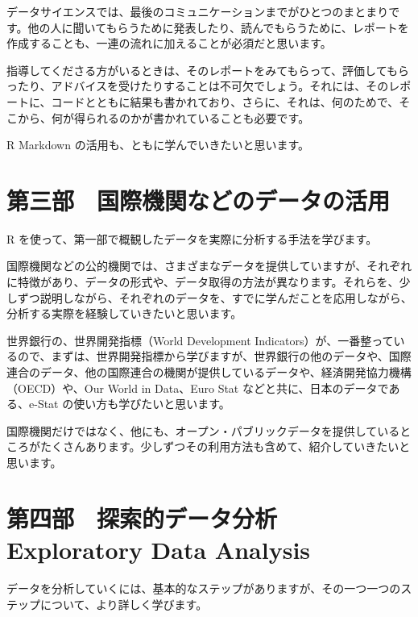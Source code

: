 \documentclass[
  xelatex, ja=standard]{bxjsbook}
\theoremstyle{definition}
\theoremstyle{definition}
\theoremstyle{definition}
\theoremstyle{definition}
\theoremstyle{remark}
\begin{document}
データサイエンスでは、最後のコミュニケーションまでがひとつのまとまりです。他の人に聞いてもらうために発表したり、読んでもらうために、レポートを作成することも、一連の流れに加えることが必須だと思います。

指導してくださる方がいるときは、そのレポートをみてもらって、評価してもらったり、アドバイスを受けたりすることは不可欠でしょう。それには、そのレポートに、コードとともに結果も書かれており、さらに、それは、何のためで、そこから、何が得られるのかが書かれていることも必要です。

R Markdown の活用も、ともに学んでいきたいと思います。

\hypertarget{ux7b2cux4e09ux90e8-ux56fdux969bux6a5fux95a2ux306aux3069ux306eux30c7ux30fcux30bfux306eux6d3bux7528}{%
\section{第三部　国際機関などのデータの活用}\label{ux7b2cux4e09ux90e8-ux56fdux969bux6a5fux95a2ux306aux3069ux306eux30c7ux30fcux30bfux306eux6d3bux7528}}

R を使って、第一部で概観したデータを実際に分析する手法を学びます。

国際機関などの公的機関では、さまざまなデータを提供していますが、それぞれに特徴があり、データの形式や、データ取得の方法が異なります。それらを、少しずつ説明しながら、それぞれのデータを、すでに学んだことを応用しながら、分析する実際を経験していきたいと思います。

世界銀行の、世界開発指標（World Development Indicators）が、一番整っているので、まずは、世界開発指標から学びますが、世界銀行の他のデータや、国際連合のデータ、他の国際連合の機関が提供しているデータや、経済開発協力機構（OECD）や、Our World in Data、Euro Stat などと共に、日本のデータである、e-Stat の使い方も学びたいと思います。

国際機関だけではなく、他にも、オープン・パブリックデータを提供しているところがたくさんあります。少しずつその利用方法も含めて、紹介していきたいと思います。

\hypertarget{ux7b2cux56dbux90e8-ux63a2ux7d22ux7684ux30c7ux30fcux30bfux5206ux6790-exploratory-data-analysis}{%
\section{第四部　探索的データ分析 Exploratory Data Analysis}\label{ux7b2cux56dbux90e8-ux63a2ux7d22ux7684ux30c7ux30fcux30bfux5206ux6790-exploratory-data-analysis}}

データを分析していくには、基本的なステップがありますが、その一つ一つのステップについて、より詳しく学びます。
\end{document}
